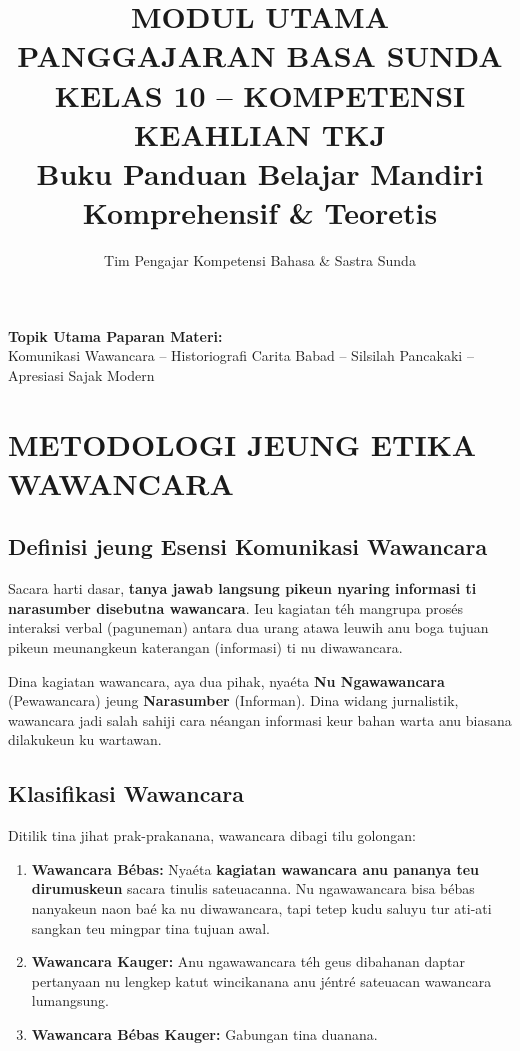\documentclass[12pt, a4paper]{article}
\title{MODUL UTAMA PANGGAJARAN BASA SUNDA\\ KELAS 10 -- KOMPETENSI KEAHLIAN TKJ\\ \large Buku Panduan Belajar Mandiri Komprehensif \& Teoretis}
\author{Tim Pengajar Kompetensi Bahasa \& Sastra Sunda}
\date{}
\begin{document}
\maketitle

\begin{center}
    \textbf{Topik Utama Paparan Materi:} \\
    Komunikasi Wawancara -- Historiografi Carita Babad -- Silsilah Pancakaki -- Apresiasi Sajak Modern
\end{center}

\tableofcontents
\newpage

\section{METODOLOGI JEUNG ETIKA WAWANCARA}

\subsection{Definisi jeung Esensi Komunikasi Wawancara}
Sacara harti dasar, \textbf{tanya jawab langsung pikeun nyaring informasi ti narasumber disebutna wawancara}. Ieu kagiatan téh mangrupa prosés interaksi verbal (paguneman) antara dua urang atawa leuwih anu boga tujuan pikeun meunangkeun katerangan (informasi) ti nu diwawancara. 

Dina kagiatan wawancara, aya dua pihak, nyaéta \textbf{Nu Ngawawancara} (Pewawancara) jeung \textbf{Narasumber} (Informan). Dina widang jurnalistik, wawancara jadi salah sahiji cara néangan informasi keur bahan warta anu biasana dilakukeun ku wartawan.

\subsection{Klasifikasi Wawancara}
Ditilik tina jihat prak-prakanana, wawancara dibagi tilu golongan:
\begin{enumerate}
    \item \textbf{Wawancara Bébas:} Nyaéta \textbf{kagiatan wawancara anu pananya teu dirumuskeun} sacara tinulis sateuacanna. Nu ngawawancara bisa bébas nanyakeun naon baé ka nu diwawancara, tapi tetep kudu saluyu tur ati-ati sangkan teu mingpar tina tujuan awal.
    \item \textbf{Wawancara Kauger:} Anu ngawawancara téh geus dibahanan daptar pertanyaan nu lengkep katut wincikanana anu jéntré sateuacan wawancara lumangsung.
    \item \textbf{Wawancara Bébas Kauger:} Gabungan tina duanana.
\end{enumerate}
\end{document}
